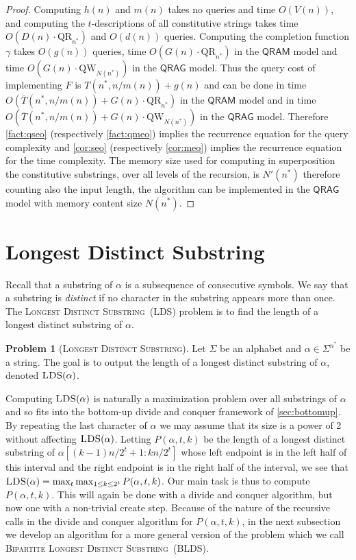 \documentclass[12pt]{article}
\newcommand{\qr}{\mathrm{QR}}
\newcommand{\qw}{\mathrm{QW}}
\newcommand{\bldsf}{\textsc{Bipartite Longest Distinct Substring}}
\newcommand{\blds}{\textsc{BLDS}}
\newcommand{\upto}{\mathbin{:}}
\newcommand{\ldsf}{\textsc{Longest Distinct Substring}}
\newcommand{\lds}{\textsc{LDS}}
\theoremstyle{definition}
\newtheorem{problem}[theorem]{Problem}
\begin{document}
\begin{proof}
Computing $h(n)$ and $m(n)$ takes no queries and time $O(V(n))$, and computing the $t$-descriptions of all constitutive strings
takes time $O( D(n) \cdot \qr_{n^*})$ and $O(d(n))$ queries. 
Computing the completion function $\gamma$ takes $O(g(n))$ queries,  time $O(G(n) \cdot \qr_{n^*}  )$ in the $\mathsf{QRAM}$ model and time $O(G(n) \cdot \qw_{N(n^*)}  )$ in the $\mathsf{QRAG}$ model. Thus the query cost of implementing $F$ is $T(n^*,n/m(n)) +g(n)$ and can be done in time $O(\overline{T}(n^*,n/m(n)) + G(n)  \cdot \qr_{n^*})$ in the $\mathsf{QRAM}$ model and in time $O(\overline{T}(n^*,n/m(n)) + G(n)  \cdot \qw_{N(n^*)})$ in the $\mathsf{QRAG}$ model.
Therefore \cref{fact:qseo} (respectively \cref{fact:qmeo}) implies the recurrence equation for the query complexity and \cref{cor:seo} (respectively \cref{cor:meo}) implies the recurrence equation for the time complexity.
The memory size used for computing in superposition the constitutive substrings, over all levels of the recursion, is $N'(n^*)$
therefore counting also the input length, the algorithm can be implemented in the $\mathsf{QRAG}$ model with memory content size $N(n^*)$.
\end{proof}


\section{Longest Distinct Substring}
\label{sec:lds}
Recall that a substring of $\alpha$ is a subsequence of consecutive symbols. 
We say that a substring is \emph{distinct} if no character in the substring appears more than once.  The \ldsf \ (\lds) problem is to find the length of a longest distinct substring of $\alpha$.

\begin{problem}[\ldsf]
Let $\Sigma$ be an alphabet and $\alpha \in \Sigma^{n^*}$ be a string. The goal is to output the length of a longest distinct substring of $\alpha$, denoted $\lds(\alpha)$.
\end{problem}

Computing $\lds(\alpha)$ is naturally a maximization problem over all substrings of $\alpha$ and so fits into the bottom-up divide and conquer framework of \cref{sec:bottomup}.  By repeating the last character of $\alpha$ we may assume that its size is a power of 2 without affecting $\lds(\alpha)$.  
Letting $P(\alpha, t, k)$ be the length of a longest distinct substring of $\alpha[(k-1)n/2^t+1 \upto k n/2^t]$ whose left endpoint is in the left half of this interval and the right endpoint is in the right half of the interval, we see that $\lds(\alpha) = \max_t \max_{1 \le k \le 2^t} P(\alpha, t, k)$.
Our main task is thus to compute $P(\alpha, t, k)$. This will again be done with a divide and conquer algorithm, but now one with a non-trivial create step.  
Because of the nature of the recursive calls in the divide and conquer algorithm for $P(\alpha,t,k)$, in the next subsection we develop an algorithm for a more general version of the problem which we call \bldsf\ (\blds).
\end{document}
